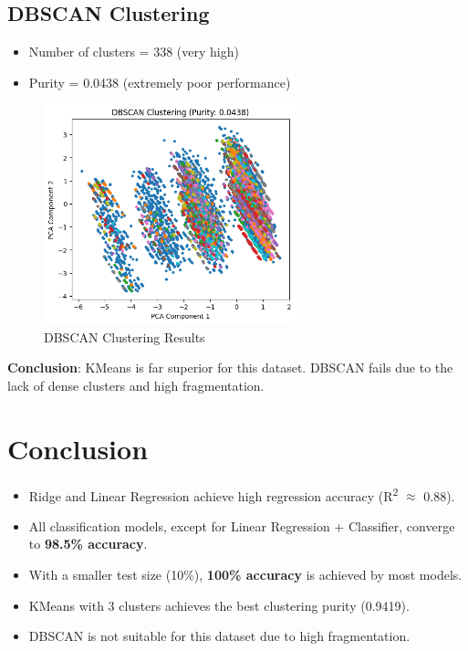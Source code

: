 \documentclass{article}
\begin{document}
\subsection*{DBSCAN Clustering}
\begin{itemize}
    \item Number of clusters = 338 (very high)
    \item Purity = 0.0438 (extremely poor performance)
\end{itemize}

\begin{figure}[H]
\centering
\includegraphics[width=0.65\textwidth]{DBScan.png}
\caption{DBSCAN Clustering Results}
\end{figure}

\textbf{Conclusion}: KMeans is far superior for this dataset. DBSCAN fails due to the lack of dense clusters and high fragmentation.

\section{Conclusion}
\begin{itemize}
    \item Ridge and Linear Regression achieve high regression accuracy (R\textsuperscript{2} $\approx$ 0.88).
    \item All classification models, except for Linear Regression + Classifier, converge to \textbf{98.5\% accuracy}.
    \item With a smaller test size (10\%), \textbf{100\% accuracy} is achieved by most models.
    \item KMeans with 3 clusters achieves the best clustering purity (0.9419).
    \item DBSCAN is not suitable for this dataset due to high fragmentation.
\end{itemize}
\end{document}
